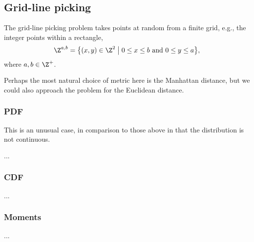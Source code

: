 \subsection{Grid-line picking}
\label{sec:grid_line}

The grid-line picking problem takes points at random from a finite
grid, e.g., the integer points within a rectangle,
\[ \Z^{a,b} = \big\{ (x,y) \in \Z^2 \; \big| 
                      \; 0 \leq x \leq b \mbox{ and } 0 \leq y \leq a
              \big\},
\]
where $a, b \in \Z^+$.

Perhaps the most natural choice of metric here is the Manhattan
distance, but we could also approach the problem for the Euclidean
distance. 

\subsubsection{PDF}

This is an unusual case, in comparison to those above in that the
distribution is not continuous.

...

\subsubsection{CDF}

...


\subsubsection{Moments}

...



